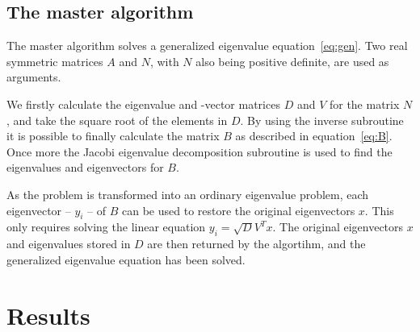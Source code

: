 \documentclass[12pt]{article}
\begin{document}
\subsection*{The master algorithm}

The master algorithm solves a generalized eigenvalue equation~\ref{eq:gen}. Two real symmetric matrices $A$ and $N$, with $N$ also being positive definite, are used as arguments.

We firstly calculate the eigenvalue and -vector matrices $D$ and $V$ for the matrix $N$, and take the square root of the elements in $D$. By using the inverse subroutine it is possible to finally calculate the matrix $B$ as described in equation~\ref{eq:B}. Once more the Jacobi eigenvalue decomposition subroutine is used to find the eigenvalues and eigenvectors for $B$. 

As the problem is transformed into an ordinary eigenvalue problem, each eigenvector -- $y_i$ -- of $B$ can be used to restore the original eigenvectors $x$. This only requires solving the linear equation $y_i = \sqrt{D}V^Tx$. The original eigenvectors $x$ and eigenvalues stored in $D$ are then returned by the algortihm, and the generalized eigenvalue equation has been solved.

\section{Results}\label{sec:results}
\end{document}

